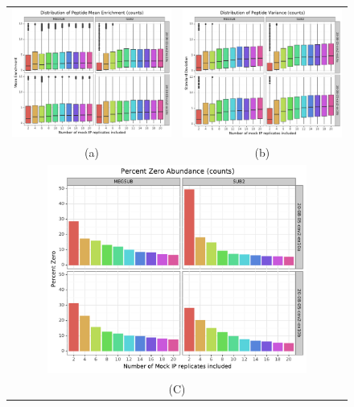 \documentclass{article}
\begin{document}
\begin{figure}
\centering
\begin{tabular}{cc}
  \includegraphics[width=65mm]{figures/42_mockip_abundance_variance/counts/mean_limit_y.pdf} &   \includegraphics[width=65mm]{figures/42_mockip_abundance_variance/counts/std_limit_y.pdf} \\
(a) & (b) \\[6pt]
\multicolumn{2}{c}{\includegraphics[width=85mm]{figures/42_mockip_abundance_variance/counts/per-zero.pdf} }\\
\multicolumn{2}{c}{(C)}
\end{tabular}

\end{figure}
\end{document}
